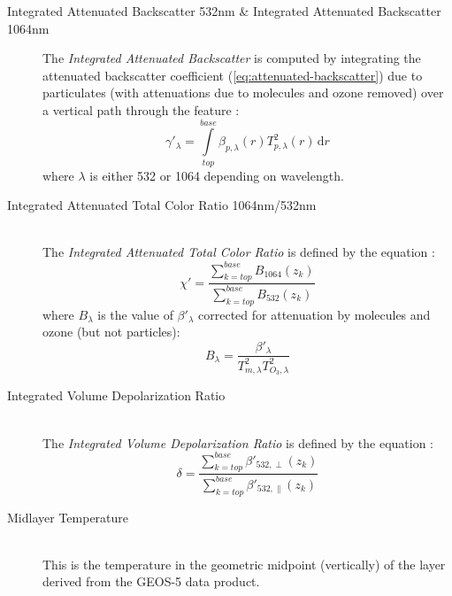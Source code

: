 \begin{description}
\item[Integrated Attenuated Backscatter 532nm \& Integrated Attenuated
Backscatter 1064nm]\hfill
The \textit{Integrated Attenuated Backscatter} is computed by integrating
the attenuated backscatter coefficient
(\ref{eq:attenuated-backscatter})
due to particulates (with attenuations due to molecules and ozone removed) over a vertical path through the feature
\citep[Equation	\,3.11]{PC-SCI-202.02}:
\begin{equation}
\gamma'_{\lambda} = \int\limits_{top}^{base} \beta_{p,\lambda}(r) T^2_{p,\lambda}(r) \, \mathrm{d}r
\end{equation}
where $\lambda$ is either 532 or 1064 depending on wavelength.


\item[Integrated Attenuated Total Color Ratio 1064nm/532nm]\hfill\\
The \textit{Integrated Attenuated Total Color Ratio} is defined by the equation
\citep[Equation\,6.13]{PC-SCI-202.02}:
\begin{equation}
\chi' = \frac{\sum\limits_{k=top}^{base}
B_{1064}(z_k)}{\sum\limits_{k=top}^{base} B_{532}(z_k)}
\end{equation}
where $B_{\lambda}$ is the value of $\beta'_{\lambda}$ corrected for attenuation
by molecules and ozone (but not particles):
\begin{equation}
B_{\lambda} = \frac{\beta'_{\lambda}}{T^2_{m,\lambda} T^2_{O_3,\lambda}}
\end{equation}

\item[Integrated Volume Depolarization Ratio]\hfill\\
The \textit{Integrated Volume Depolarization Ratio} is defined by the equation
\citep[Equation\,6.10]{PC-SCI-202.02}:
\begin{equation}
\delta = \frac{\sum\limits_{k=top}^	{base}
\beta'_{532,\perp}(z_k)}{\sum\limits_{k=top}^{base} \beta'_{532,\parallel}(z_k)}
\end{equation}

\item[Midlayer Temperature]\hfill\\
This is the temperature in the geometric midpoint (vertically) of the layer derived from the GEOS-5 data product.
\end{description}

